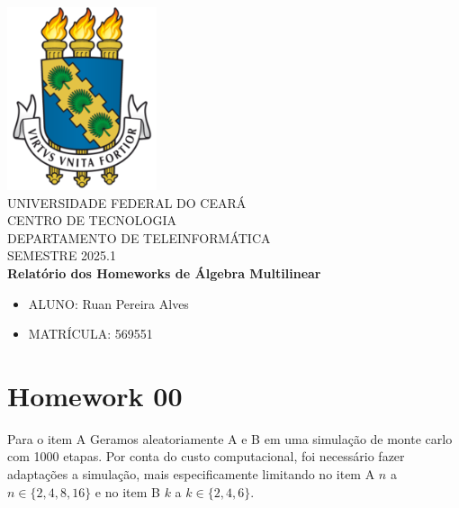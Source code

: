 \documentclass[a4paper, 12pt]{article}
\let\oldsection\section
\renewcommand{\section}[1]{{\vspace{20pt}\oldsection*{#1}\vspace{-10pt}}}
\begin{document}
	
	\clearpage
	\thispagestyle{empty}
	
	\begin{bfseries}
		\begin{center}
			
			\includegraphics[scale=0.45]{ufc.png} \\
			\vspace{-4pt} 
			UNIVERSIDADE FEDERAL DO CEARÁ \\
			\vspace{4pt} 
			CENTRO DE TECNOLOGIA \\
			\vspace{4pt} 
			DEPARTAMENTO DE TELEINFORMÁTICA \\
			\vspace{4pt}
			\vspace{4pt}
			SEMESTRE 2025.1 \\
			
			
			\vspace*{\fill}
			\textbf{Relatório dos Homeworks de Álgebra Multilinear}
			\vspace*{\fill}
			
		\end{center}
		
		\begin{itemize}[leftmargin=*]
			\setlength{\itemsep}{0pt}
			\item[] ALUNO: Ruan Pereira Alves
			\item[] MATRÍCULA: 569551
		\end{itemize}
		
	\end{bfseries}
	\newpage
	
	\section{Homework 00}
	
	Para o item A
	Geramos aleatoriamente A e B em uma simulação de monte carlo com 1000 etapas. Por conta do custo computacional, foi necessário fazer adaptações a simulação, mais especificamente limitando no item A $n$ a $n \in \{2,4,8,16\}$ e no item B $k$ a $k \in \{2,4,6\}$.
	
\end{document}
